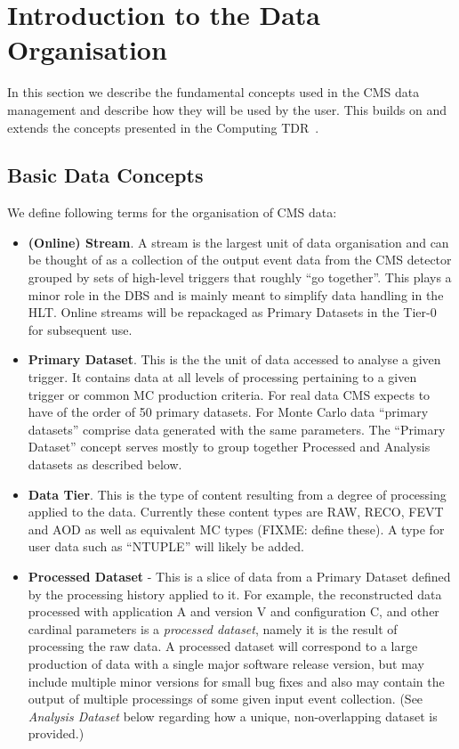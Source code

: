 \documentclass{cmspaper}
\begin{document}
\section{Introduction to the Data Organisation}
  In this section we describe the fundamental concepts used in the CMS
data management and describe how they will be used by the user. This
builds on and extends the concepts presented in the Computing TDR~\cite{CTDR}.

\subsection{Basic Data Concepts}
\label{sec:data}
We define following terms for the organisation of CMS data:

\begin{itemize}
\item {\bf (Online) Stream}. A stream is the largest unit of data organisation
and can be thought of as a collection of the output event data from the CMS
detector grouped by sets of high-level triggers that roughly ``go together''.
This plays a minor role in the DBS and is mainly meant to simplify data 
handling in the HLT. Online streams will be repackaged as Primary Datasets 
in the Tier-0 for subsequent use.

\item {\bf Primary Dataset}. This is the the unit of 
data accessed to analyse a given trigger.  It contains data at all levels of 
processing pertaining to a given trigger or common MC production criteria.
For real data CMS expects to have of the order of 50 primary datasets.  
For Monte Carlo data ``primary datasets'' comprise data generated with the 
same parameters. The ``Primary Dataset'' concept serves mostly to group 
together Processed and Analysis datasets as described below.

\item {\bf Data Tier}. This is the type of content resulting from a 
degree of processing applied to the data. Currently these content types
are RAW, RECO, FEVT and AOD as well as equivalent MC types (FIXME: define 
these). A type for user data such as ``NTUPLE'' will likely be added. 

\item {\bf Processed Dataset} - This is a slice of data from a Primary Dataset
defined by the processing history applied to it.  For example, the 
reconstructed data processed with application A and version V and 
configuration C, and other cardinal parameters is a {\em processed dataset}, 
namely it is the result of processing the raw data. A processed dataset
will correspond to a large production of data with a single major software
release version, but may include multiple minor versions for small bug
fixes and also may contain the output of multiple processings of some 
given input event collection. (See {\em Analysis Dataset} below regarding
how a unique, non-overlapping dataset is provided.)


\end{itemize}
\end{document}
